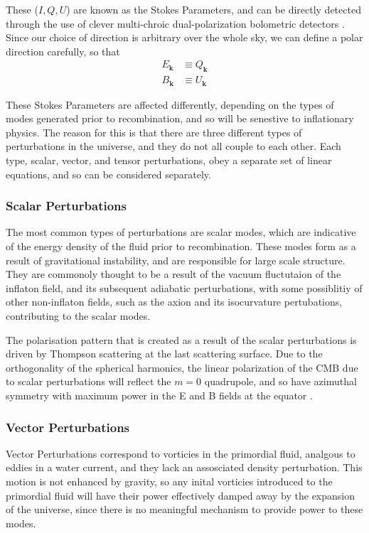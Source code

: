 {These ($I,Q,U$) are known as the Stokes Parameters, and can be directly detected through the use of clever multi-chroic dual-polarization bolometric detectors \cite{1210.8256}. Since our choice of direction is arbitrary over the whole sky, we can define a polar direction carefully, so that
\begin{align*}
	E_\textbf{k} & \equiv Q_\textbf{k} \\
	B_\textbf{k} & \equiv U_\textbf{k} 
\end{align*}


\par These Stokes Parameters are affected differently, depending on the types of modes generated prior to recombination, and so will be senestive to inflationary physics. The reason for this is that there are three different types of perturbations in the universe, and they do not all couple to each other. Each type, scalar, vector, and tensor perturbations, obey a separate set of linear equations, and so can be considered separately.

\subsubsection{Scalar Perturbations}
The most common types of perturbations are scalar modes, which are indicative of the energy density of the fluid prior to recombination. These modes form as a result of gravitational instability, and are responsible for large scale structure. They are commonoly thought to be a result of the vacuum fluctutaion of the inflaton field, and its subsequent adiabatic perturbations, with some possiblitiy of other non-inflaton fields, such as the axion and its isocurvature pertubations, contributing to the scalar modes.

The polarisation pattern that is created as a result of the scalar perturbations is driven by Thompson scattering at the last scattering surface. Due to the orthogonality of the spherical harmonics, the linear polarization of the CMB due to scalar perturbations will reflect the $m=0$ quadrupole, and so have azimuthal symmetry with maximum power in the E and B fields at the equator \cite{Hu:Polarisation}.

\subsubsection{Vector Perturbations}
Vector Perturbations correspond to vorticies in the primordial fluid, analgous to eddies in a water current, and they lack an assosciated density perturbation. This motion is not enhanced by gravity, so any inital vorticies introduced to the primordial fluid will have their power effectively damped away by the expansion of the universe, since there is no meaningful mechanism to provide power to these modes.

}
